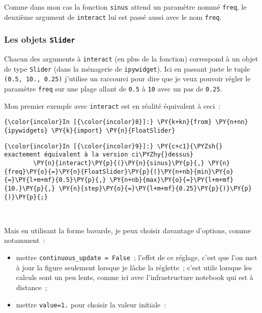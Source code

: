 Comme dans mon cas la fonction \texttt{sinus} attend un paramètre nommé
\texttt{freq}, le deuxième argument de \texttt{interact} lui est passé
aussi avec le nom \texttt{freq}.

    \hypertarget{les-objets-slider}{%
\subsubsection{\texorpdfstring{Les objets
\texttt{Slider}}{Les objets Slider}}\label{les-objets-slider}}

    Chacun des arguments à \texttt{interact} (en plus de la fonction)
correspond à un objet de type \texttt{Slider} (dans la ménagerie de
\texttt{ipywidget}). Ici en passant juste le tuple
\texttt{(0.5,\ 10.,\ 0.25)} j'utilise un raccourci pour dire que je veux
pouvoir régler le paramètre \texttt{freq} sur une plage allant de
\texttt{0.5} à \texttt{10} avec un pas de \texttt{0.25}.

    Mon premier exemple avec \texttt{interact} est en réalité équivalent à
ceci~:

    \begin{Verbatim}[commandchars=\\\{\}]
{\color{incolor}In [{\color{incolor}8}]:} \PY{k+kn}{from} \PY{n+nn}{ipywidgets} \PY{k}{import} \PY{n}{FloatSlider}
\end{Verbatim}


    \begin{Verbatim}[commandchars=\\\{\}]
{\color{incolor}In [{\color{incolor}9}]:} \PY{c+c1}{\PYZsh{} exactement équivalent à la version ci\PYZhy{}dessus}
        \PY{n}{interact}\PY{p}{(}\PY{n}{sinus}\PY{p}{,} \PY{n}{freq}\PY{o}{=}\PY{n}{FloatSlider}\PY{p}{(}\PY{n+nb}{min}\PY{o}{=}\PY{l+m+mf}{0.5}\PY{p}{,} \PY{n+nb}{max}\PY{o}{=}\PY{l+m+mf}{10.}\PY{p}{,} \PY{n}{step}\PY{o}{=}\PY{l+m+mf}{0.25}\PY{p}{)}\PY{p}{)}\PY{p}{;}
\end{Verbatim}


    \begin{center}
    \end{center}
    { \hspace*{\fill} \\}
    
    Mais en utilisant la forme bavarde, je peux choisir davantage d'options,
comme notamment~:

\begin{itemize}
\tightlist
\item
  mettre \texttt{continuous\_update\ =\ False}~; l'effet de ce réglage,
  c'est que l'on met à jour la figure seulement lorsque je lâche la
  réglette~; c'est utile lorsque les calculs sont un peu lents, comme
  ici avec l'infrastructure notebook qui est à distance~;
\item
  mettre \texttt{value=1.} pour choisir la valeur initiale~:
\end{itemize}

